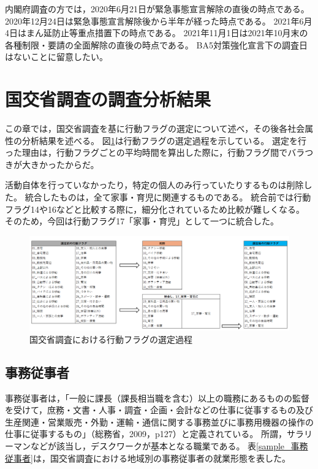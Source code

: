 \documentclass[paper={210mm,297mm},fontsize=15Q,line_length=35zw,number_of_lines=31,head_space=30mm,gutter=40mm,baselineskip=2.0zw,headfoot_verticalposition=1.5zw]{jlreq}
\begin{document}
内閣府調査の方では，2020年6月21日が緊急事態宣言解除の直後の時点である。
2020年12月24日は緊急事態宣言解除後から半年が経った時点である。
2021年6月4日はまん延防止等重点措置下の時点である。
2021年11月1日は2021年10月末の各種制限・要請の全面解除の直後の時点である。
BA5対策強化宣言下の調査日はないことに留意したい。

\section{国交省調査の調査分析結果}

この章では，国交省調査を基に行動フラグの選定について述べ，その後各社会属性の分析結果を述べる。
図\ref{行動フラグの選定}は行動フラグの選定過程を示している。
選定を行った理由は，行動フラグごとの平均時間を算出した際に，行動フラグ間でバラつきが大きかったからだ。

活動自体を行っていなかったり，特定の個人のみ行っていたりするものは削除した。
統合したものは，全て家事・育児に関連するものである。
統合前では行動フラグ14や16などと比較する際に，細分化されているため比較が難しくなる。
そのため，今回は行動フラグ17「家事・育児」として一つに統合した。

\begin{figure}[H]
  \centering
  \includegraphics[width=120mm]{../Figure/c04_fig_行動フラグの選定過程.png}
  \caption{国交省調査における行動フラグの選定過程}
  \label{行動フラグの選定}
\end{figure}

\subsection{事務従事者}

事務従事者は，「一般に課長（課長相当職を含む）以上の職務にあるものの監督を受けて，庶務・文書・人事・調査・企画・会計などの仕事に従事するもの及び生産関連・営業販売・外勤・運輸・通信に関する事務並びに事務用機器の操作の仕事に従事するもの」（総務省，2009，p127）と定義されている。
所謂，サラリーマンなどが該当し，デスクワークが基本となる職業である。
表\ref{sample_事務従事者}は，国交省調査における地域別の事務従事者の就業形態を表した。
\end{document}
